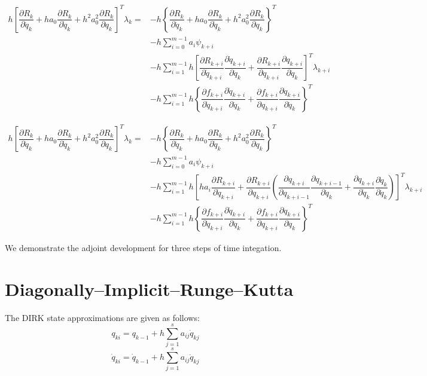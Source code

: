 \documentclass[10pt,letter]{book}
\newcommand{\pd}[2]{\dfrac{\partial #1}{\partial #2}}
\begin{document}
     \begin{equation}
       \begin{split}
         h \left[ \pd{R_k}{\ddot{q}_k} + h a_0 \pd{R_k}{\dot{q}_k} +  h^2 a_0^2  \pd{R_k}{{q}_k} \right]^T \lambda_k = & -  h \left\{ \pd{R_k}{\ddot{q}_k} + h a_0 \pd{R_k}{\dot{q}_k} +  h^2 a_0^2  \pd{R_k}{{q}_k} \right\}^T\\
         & - h \sum_{i=0}^{m-1} a_i \psi_{k+i} \\
         & - h \sum_{i=1}^{m-1} h \left[ \pd{R_{k+i}}{\dot{q}_{k+i}}\pd{\dot{q}_{k+i}}{\ddot{q}_k} + \pd{R_{k+i}}{q_{k+i}}\pd{q_{k+i}}{\ddot{q}_k} \right]^T \lambda_{k+i}\\
         & - h \sum_{i=1}^{m-1} h \left\{ \pd{f_{k+i}}{\dot{q}_{k+i}}\pd{\dot{q}_{k+i}}{\ddot{q}_k} + \pd{f_{k+i}}{q_{k+i}}\pd{q_{k+i}}{\ddot{q}_k} \right\}^T
       \end{split}
     \end{equation}

     \begin{equation}
       \begin{split}
         h \left[ \pd{R_k}{\ddot{q}_k} + h a_0 \pd{R_k}{\dot{q}_k} +  h^2 a_0^2  \pd{R_k}{{q}_k} \right]^T \lambda_k = & -  h \left\{ \pd{R_k}{\ddot{q}_k} + h a_0 \pd{R_k}{\dot{q}_k} +  h^2 a_0^2  \pd{R_k}{{q}_k} \right\}^T\\
         & - h \sum_{i=0}^{m-1} a_i \psi_{k+i} \\
         & - h \sum_{i=1}^{m-1} h \left[ ha_i \pd{R_{k+i}}{\dot{q}_{k+i}} + \pd{R_{k+i}}{q_{k+i}} \left( \pd{q_{k+i}}{q_{k+i-1}}  \pd{q_{k+i-1}} {\ddot{q}_k} +  \pd{q_{k+i}}{\dot{q}_{k}} \pd{\dot{q}_{k}} {\ddot{q}_k} \right) \right]^T \lambda_{k+i}\\
         & - h \sum_{i=1}^{m-1} h \left\{ \pd{f_{k+i}}{\dot{q}_{k+i}}\pd{\dot{q}_{k+i}}{\ddot{q}_k} + \pd{f_{k+i}}{q_{k+i}}\pd{q_{k+i}}{\ddot{q}_k} \right\}^T
       \end{split}
     \end{equation}

     We demonstrate the adjoint development for three steps of time
     integation.

     \section{Diagonally--Implicit--Runge--Kutta}
     The DIRK state approximations are given as follows:
     $${q_{ki}} = q_{k-1} + h \sum_{j=1}^s a_{ij} \dot{q}_{kj}$$
     $${\dot{q}_{ki}} = \dot{q}_{k-1} + h \sum_{j=1}^s a_{ij} \ddot{q}_{kj}$$
\end{document}
